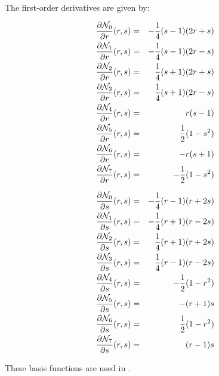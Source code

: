 The first-order derivatives are given by:

\begin{mdframed}[backgroundcolor=blue!5]
\begin{eqnarray}
\frac{\partial {\mathcal{N}}_0}{\partial r}(r,s)&=& -\frac{1}{4}(s-1)(2r+s)  \\
\frac{\partial {\mathcal{N}}_1}{\partial r}(r,s)&=& -\frac{1}{4}(s-1)(2r-s)  \\
\frac{\partial {\mathcal{N}}_2}{\partial r}(r,s)&=& \frac{1}{4}(s+1)(2r+s)  \\
\frac{\partial {\mathcal{N}}_3}{\partial r}(r,s)&=& \frac{1}{4}(s+1)(2r-s)  \\
\frac{\partial {\mathcal{N}}_4}{\partial r}(r,s)&=& r(s-1)  \\
\frac{\partial {\mathcal{N}}_5}{\partial r}(r,s)&=& \frac{1}{2} (1-s^2)  \\
\frac{\partial {\mathcal{N}}_6}{\partial r}(r,s)&=& -r(s+1)  \\
\frac{\partial {\mathcal{N}}_7}{\partial r}(r,s)&=& -\frac{1}{2} (1-s^2)  
\end{eqnarray}
\end{mdframed}

\begin{mdframed}[backgroundcolor=blue!5]
\begin{eqnarray}
\frac{\partial {\mathcal{N}}_0}{\partial s}(r,s)&=& -\frac{1}{4}(r-1)(r+2s) \\
\frac{\partial {\mathcal{N}}_1}{\partial s}(r,s)&=& -\frac{1}{4}(r+1)(r-2s) \\
\frac{\partial {\mathcal{N}}_2}{\partial s}(r,s)&=&  \frac{1}{4}(r+1)(r+2s) \\
\frac{\partial {\mathcal{N}}_3}{\partial s}(r,s)&=&  \frac{1}{4}(r-1)(r-2s) \\
\frac{\partial {\mathcal{N}}_4}{\partial s}(r,s)&=& - \frac{1}{2}(1-r^2)\\
\frac{\partial {\mathcal{N}}_5}{\partial s}(r,s)&=&  -(r+1)s \\
\frac{\partial {\mathcal{N}}_6}{\partial s}(r,s)&=& \frac{1}{2} (1-r^2)\\
\frac{\partial {\mathcal{N}}_7}{\partial s}(r,s)&=&  (r-1)s
\end{eqnarray}
\end{mdframed}
These basis functions are used in .
